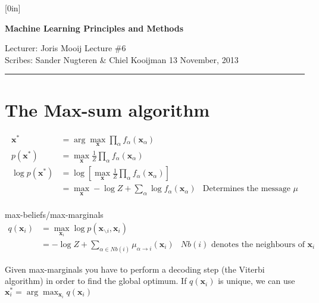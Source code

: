 \documentclass[11pt]{article}
\renewcommand{\vec}[1]{\boldsymbol{#1}}
\begin{document}
\thispagestyle{empty}

\raisebox{0.6in}[0in]{}
\vspace{-0.7in}

\begin{center}
\bf\large Machine Learning Principles and Methods
\end{center}

\noindent
Lecturer: Joris Mooij				  %
\hfill
Lecture \#6                            %
\\
Scribes: Sander Nugteren \& Chiel Kooijman  %
\hfill
13 November, 2013                        %

\noindent
\rule{\textwidth}{1pt}

\medskip


\section*{The Max-sum algorithm}
\begin{align*}
	\displaystyle
	\vec{x}^* &= \arg\max_{\vec{x}} \prod_\alpha f_\alpha (\vec{x}_\alpha)\\
	p(\vec{x}^*) &= \max_{\vec{x}} \frac{1}{Z} \prod_\alpha f_\alpha (\vec{x}_\alpha)\\
	\log p(\vec{x}^*) &= \log\left[\max_{\vec{x}} \frac{1}{Z} \prod_\alpha
			f_\alpha (\vec{x}_\alpha)\right]\\
	&= \max_{\vec{x}} -\log Z + \sum_\alpha \log f_\alpha (\vec{x}_\alpha)&
			\text{Determines the message $\mu$}\\
\end{align*}


max-beliefs/max-marginals
\begin{align*}
	\displaystyle
	q(\vec{x}_i) &= \max_{\vec{x}_i}
	\log p(\vec{x}_{\smallsetminus i}, \vec{x}_i)\\
				&= -\log Z +
	\sum_{\alpha \in \mathit{Nb}(i)} \mu_{\alpha \rightarrow i}(\vec{x}_i)
	& \text{$\mathit{Nb}(i)$ denotes the neighbours of $\vec{x}_i$}
\end{align*}

Given max-marginals you have to perform a decoding step (the Viterbi algorithm)
in order to find the global optimum. If $q(\vec{x}_i)$ is unique, we can use
$\vec{x}^*_i = \arg\max_{\vec{x}_i} q(\vec{x}_i)$
\end{document}
